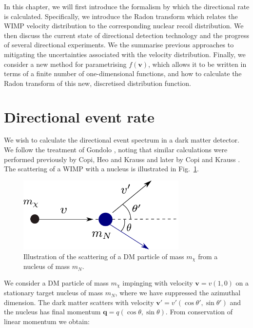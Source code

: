 In this chapter, we will first introduce the formalism by which the directional rate is calculated. Specifically, we introduce the Radon transform which relates the WIMP velocity distribution to the corresponding nuclear recoil distribution.  We then discuss the current state of directional detection technology and the progress of several directional experiments. We the summarise previous approaches to mitigating the uncertainties associated with the velocity distribution. Finally, we consider a new method for parametrising $f(\textbf{v})$, which allows it to be written in terms of a finite number of one-dimensional functions, and how to calculate the Radon transform of this new, discretised distribution function.




\section{Directional event rate}

We wish to calculate the directional event spectrum in a dark matter detector. We follow the treatment of Gondolo \cite{Gondolo:2002}, noting that similar calculations were performed previously by Copi, Heo and Krauss \cite{Copi:1999} and later by Copi and Krauss \cite{Copi:2001}. The scattering of a WIMP with a nucleus is illustrated in Fig.~\ref{fig:directional:scattering}.

\begin{figure}[h!]
  \centering
  \includegraphics[width=0.75\textwidth]{Directional/Scattering.pdf}
\caption[Illustration of DM-nucleus scattering]{Illustration of the scattering of a DM particle of mass $m_\chi$ from a nucleus of mass $m_N$.}
  \label{fig:directional:scattering}
\end{figure}

We consider a DM particle of mass \(m_\chi\) impinging with velocity \(\textbf{v} = v\left(1,0\right)\) on a stationary target nucleus of mass \(m_N\), where we have suppressed the azimuthal dimension. The dark matter scatters with velocity \(\textbf{v}' = v'\left(\cos \theta',\sin \theta'\right)\) and the nucleus has final momentum \(\textbf{q} = q\left(\cos \theta, \sin \theta\right)\). From conservation of linear momentum we obtain:

